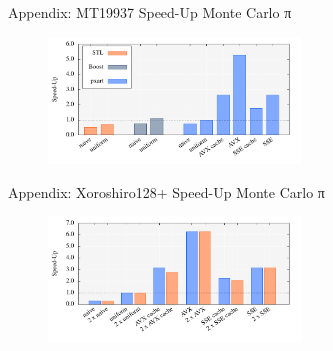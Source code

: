 \documentclass[aspectratio=169]{beamer}
\begin{document}
  \begin{frame}{Appendix: MT19937 Speed-Up Monte Carlo π}
    \begin{figure}
      \includegraphics[width=0.6\textwidth]{figures/monte_carlo_pi_desktop_mt19937.pdf}\\
    \end{figure}
  \end{frame}

  \begin{frame}{Appendix: Xoroshiro128+ Speed-Up Monte Carlo π}
    \begin{figure}
      \includegraphics[width=0.6\textwidth]{figures/monte_carlo_pi_desktop_xrsr128p.pdf}
    \end{figure}
  \end{frame}
\end{document}
